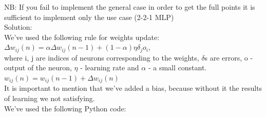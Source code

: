 \documentclass[a4paper, 12pt]{article}
\begin{document}
NB: If you fail to implement the general case in order to get the full points it is sufficient to implement only the use case (2-2-1 MLP)\\

Solution:\\

We've used the following rule for weights update:\\

$\Delta w_{ij}(n) = \alpha  \Delta w_{ij}(n-1) + (1-\alpha)\eta \delta_j o_i$,\\
where i, j are indices of neurons corresponding to the weights, $\delta$s are errors, o - output of the neuron, $\eta$ - learning rate and $\alpha$ -  a small constant.\\
$w_{ij}(n) = w_{ij}(n - 1) + \Delta w_{ij}(n)$ \\

It is important to mention that we've added a bias, because without it the results of learning we not satisfying.\\

We've used the following Python code:
\end{document}
